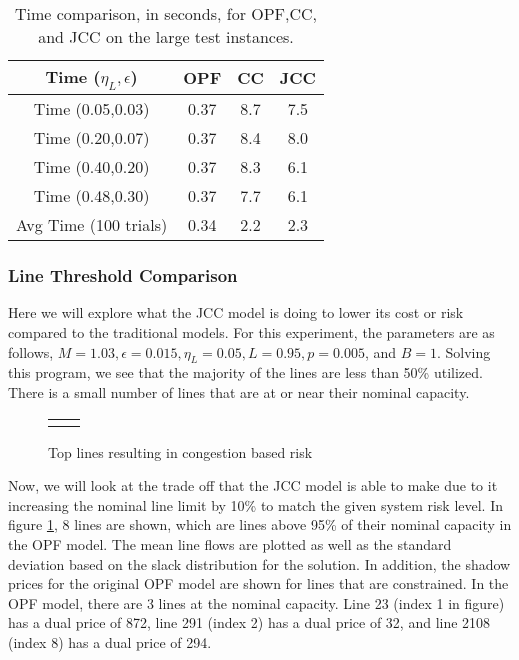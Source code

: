 \begin{table}
\centering
\begin{tabular}{| c| c c c| }
\hline
Time ($\eta_L,\epsilon$) & OPF & CC & JCC \\
\hline
\hline
Time (0.05,0.03)& 0.37  & 8.7 & 7.5 \\
Time (0.20,0.07)& 0.37  & 8.4 & 8.0 \\
Time (0.40,0.20)& 0.37  & 8.3 & 6.1 \\
Time (0.48,0.30)& 0.37  & 7.7 & 6.1 \\
\hline
\hline
Avg Time (100 trials)& 0.34  & 2.2 & 2.3 \\
\hline
\end{tabular}
\caption{Time comparison, in seconds, for OPF,CC, and JCC on the large test instances.}\label{solve_time}
\end{table}


\subsubsection*{Line Threshold Comparison}
Here we will explore what the JCC model is doing to lower its cost or risk compared to the traditional models.  For this experiment, the parameters are as follows, $M=1.03, \epsilon=0.015, \eta_L=0.05, L=0.95, p=0.005$, and $B=1$.  Solving this program, we see that the majority of the lines are less than 50\% utilized.  There is a small number of lines that are at or near their nominal capacity.

\begin{figure}
\begin{tabular}{c c}

&

\end{tabular}
\caption{Top lines resulting in congestion based risk}\label{solve_shadow}
\end{figure}


Now, we will look at the trade off that the JCC model is able to make due to it increasing the nominal line limit by 10\% to match the given system risk level.  In figure \ref{solve_shadow}, 8 lines are shown, which are lines above 95\% of their nominal capacity in the OPF model.  The mean line flows are plotted as well as the standard deviation based on the slack distribution for the solution.  
In addition, the shadow prices for the original OPF model are shown for lines that are constrained.  In the OPF model, there are 3 lines at the nominal capacity.  Line 23 (index 1 in figure) has a dual price of 872, line 291 (index 2) has a dual price of 32, and line 2108 (index 8) has a dual price of 294.


